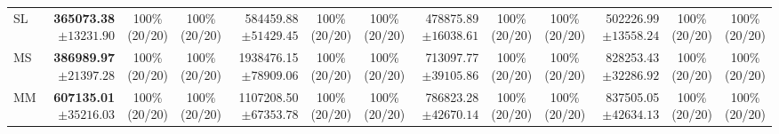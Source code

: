 \begin{table}[!t]
\begin{tabular}{@{}l*{4}{rcc}@{}}
SL & \shortstack[r]{\textbf{365073.38}\\$\pm 13231.90$} & \shortstack[c]{100\%\\(20/20)} & \shortstack[c]{100\%\\(20/20)} & \shortstack[r]{584459.88\\$\pm 51429.45$} & \shortstack[c]{100\%\\(20/20)} & \shortstack[c]{100\%\\(20/20)} & \shortstack[r]{478875.89\\$\pm 16038.61$} & \shortstack[c]{100\%\\(20/20)} & \shortstack[c]{100\%\\(20/20)} & \shortstack[r]{502226.99\\$\pm 13558.24$} & \shortstack[c]{100\%\\(20/20)} & \shortstack[c]{100\%\\(20/20)} \\
MS & \shortstack[r]{\textbf{386989.97}\\$\pm 21397.28$} & \shortstack[c]{100\%\\(20/20)} & \shortstack[c]{100\%\\(20/20)} & \shortstack[r]{1938476.15\\$\pm 78909.06$} & \shortstack[c]{100\%\\(20/20)} & \shortstack[c]{100\%\\(20/20)} & \shortstack[r]{713097.77\\$\pm 39105.86$} & \shortstack[c]{100\%\\(20/20)} & \shortstack[c]{100\%\\(20/20)} & \shortstack[r]{828253.43\\$\pm 32286.92$} & \shortstack[c]{100\%\\(20/20)} & \shortstack[c]{100\%\\(20/20)} \\
MM & \shortstack[r]{\textbf{607135.01}\\$\pm 35216.03$} & \shortstack[c]{100\%\\(20/20)} & \shortstack[c]{100\%\\(20/20)} & \shortstack[r]{1107208.50\\$\pm 67353.78$} & \shortstack[c]{100\%\\(20/20)} & \shortstack[c]{100\%\\(20/20)} & \shortstack[r]{786823.28\\$\pm 42670.14$} & \shortstack[c]{100\%\\(20/20)} & \shortstack[c]{100\%\\(20/20)} & \shortstack[r]{837505.05\\$\pm 42634.13$} & \shortstack[c]{100\%\\(20/20)} & \shortstack[c]{100\%\\(20/20)} \\

\end{tabular}
\end{table}
